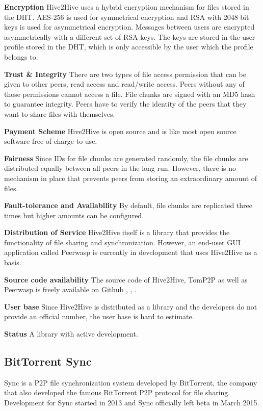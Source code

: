 \textbf{Encryption}
Hive2Hive uses a hybrid encryption mechanism for files stored in the DHT. AES-256 is used for symmetrical encryption and RSA with 2048 bit keys is used for asymmetrical encryption. Messages between users are encrypted asymmetrically with a different set of RSA keys. The keys are stored in the user profile stored in the DHT, which is only accessible by the user which the profile belongs to.

\textbf{Trust \& Integrity}
There are two types of file access permission that can be given to other peers, read access and read/write access. Peers without any of those permissions cannot access a file. File chunks are signed with an MD5 hash to guarantee integrity. Peers have to verify the identity of the peers that they want to share files with themselves.

\textbf{Payment Scheme}
Hive2Hive is open source and is like most open source software free of charge to use.

\textbf{Fairness}
Since IDs for file chunks are generated randomly, the file chunks are distributed equally between all peers in the long run. However, there is no mechanism in place that prevents peers from storing an extraordinary amount of files.

\textbf{Fault-tolerance and Availability}
By default, file chunks are replicated three times but higher amounts can be configured.

\textbf{Distribution of Service}
Hive2Hive itself is a library that provides the functionality of file sharing and synchronization. However, an end-user GUI application called Peerwasp \cite{peerwasp} is currently in development that uses Hive2Hive as a basis.

\textbf{Source code availability}
The source code of Hive2Hive, TomP2P as well as Peerwasp is freely available on Github \cite{hive2hive:github}, \cite{tomp2p:github}, \cite{peerwasp:github}. 

\textbf{User base}
Since Hive2Hive is distributed as a library and the developers do not provide an official number, the user base is hard to estimate.

\textbf{Status}
A library with active development.

\subsection{BitTorrent Sync}
\label{subsec:bittorrent}
Sync is a P2P file synchronization system developed by BitTorrent, the company that also developed the famous BitTorrent P2P protocol for file sharing. Development for Sync started in 2013 and Sync officially left beta in March 2015.

